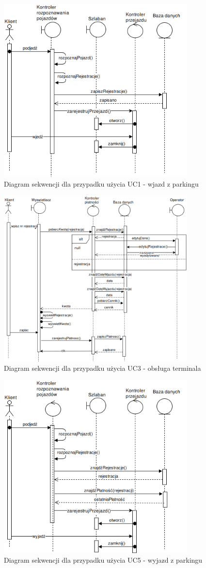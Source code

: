 \begin{figure}[H]
	\centering
	\includegraphics[width=100mm]{diagramy/sekwencyjnyWjazd.png}
	\caption{Diagram sekwencji dla przypadku użycia UC1 - wjazd z parkingu}
\end{figure}

\begin{figure}[H]
	\centering
	\includegraphics[width=100mm]{diagramy/sekwencyjnyPlatnosci.png}
  \caption{Diagram sekwencji dla przypadku użycia UC3 - obsługa terminala}
\end{figure}

\begin{figure}[H]
	\centering
	\includegraphics[width=100mm]{diagramy/sekwencyjnyWyjazd.png}
  \caption{Diagram sekwencji dla przypadku użycia UC5 - wyjazd z parkingu}
\end{figure}



